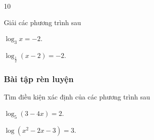 \begin{indapan}{10}
\begin{vd} %
	Giải các phương trình sau
	\begin{listEX}[2]
		\item $\log _3 x=-2$.
		\item $\log _{\tfrac{1}{2}}(x-2)=-2$.
	\end{listEX}
\end{vd}

\subsubsection{Bài tập rèn luyện} 

\begin{bt}
	Tìm điều kiện xác định của các phương trình sau
	\begin{listEX}[2]
		\item $\log_5(3-4x)=2$.
		\item $\log(x^2-2x-3)=3$.
	\end{listEX}
\end{bt}


\end{indapan}
